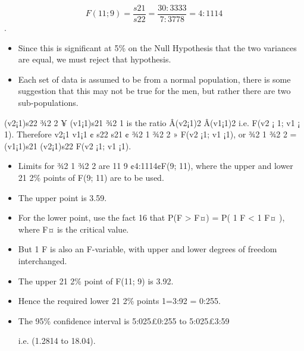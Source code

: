 \documentclass[a4paper,12pt]{article}
\begin{document}
\begin{enumerate}
\[ F(11;9) = \frac{s21}{s22}  = \frac{30:3333}{7:3778} 
= 4:1114\]. 

\begin{itemize}
    \item Since this is significant at 5\% on the Null Hypothesis that the
two variances are equal, we must reject that hypothesis.
\item Each set of data is
assumed to be from a normal population, there is some suggestion that this
may not be true for the men, but rather there are two sub-populations.
\end{itemize}

(v2¡1)s22 ¾2
2
¥ (v1¡1)s21
¾2
1
is the ratio Â(v2¡1)2
Â(v1¡1)2
i.e. F(v2 ¡ 1; v1 ¡ 1). Therefore
v2¡1
v1¡1 ¢ s22
s21
¢ ¾2
1
¾2
2
» F(v2 ¡1; v1 ¡1), or ¾2
1
¾2
2
= (v1¡1)s21
(v2¡1)s22
F(v2 ¡1; v1 ¡1). 
\begin{itemize}
    \item Limits for
¾2
1
¾2
2
are 11
9 ¢4:1114¢F(9; 11), where the upper and lower 21
2\% points of F(9; 11)
are to be used. 
\item The upper point is 3.59. 
\item For the lower point, use the fact
16
that P(F > F¤) = P( 1
F < 1
F¤ ), where F¤ is the critical value.
\item But 1
F is also
an F-variable, with upper and lower degrees of freedom interchanged. \item The
upper 21
2\% point of F(11; 9) is 3.92.
\item Hence the required lower 21
2\% points
1=3:92 = 0:255. 
\item The 95\% confidence interval is 5:025£0:255 to 5:025£3:59

i.e. (1.2814 to 18.04).
\end{itemize}

\end{enumerate}
\end{document}
